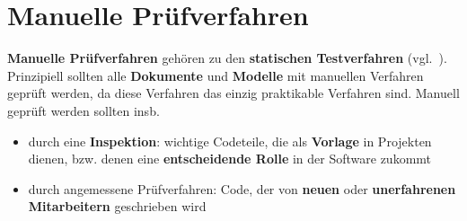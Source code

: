 \section{Manuelle Prüfverfahren}

\vspace{2mm}
\begin{tcolorbox}[title=Manuelle Prüfverfahren]
    \textbf{Manuelle Prüfverfahren} gehören zu den \textbf{statischen Testverfahren} (vgl.~\cite[396]{Bal97}).\\
    Prinzipiell sollten alle \textbf{Dokumente} und \textbf{Modelle} mit manuellen Verfahren geprüft werden, da diese Verfahren das einzig praktikable Verfahren sind.
    Manuell geprüft werden sollten insb.

    \begin{itemize}
        \item durch eine \textbf{Inspektion}: wichtige Codeteile, die als \textbf{Vorlage} in Projekten dienen, bzw. denen eine \textbf{entscheidende Rolle} in der Software zukommt
        \item durch angemessene Prüfverfahren: Code, der von \textbf{neuen} oder \textbf{unerfahrenen Mitarbeitern} geschrieben wird
    \end{itemize}


\end{tcolorbox}

